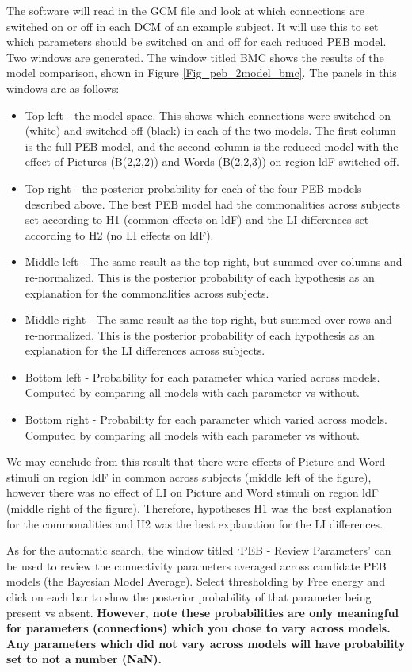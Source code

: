 \documentclass{article}
\begin{document}
The software will read in the GCM file and look at which connections are switched on or off in each DCM of an example subject. It will use this to set which parameters should be switched on and off for each reduced PEB model. Two windows are generated. The window titled BMC shows the results of the model comparison, shown in Figure \ref{Fig_peb_2model_bmc}. The panels in this windows are as follows:
\begin{itemize}
    \item Top left - the model space. This shows which connections were switched on (white) and switched off (black) in each of the two models. The first column is the full PEB model, and the second column is the reduced model with the effect of Pictures (B(2,2,2)) and Words (B(2,2,3)) on region ldF switched off.
    \item Top right - the posterior probability for each of the four PEB models described above. The best PEB model had the commonalities across subjects set according to H1 (common effects on ldF) and the LI differences set according to H2 (no LI effects on ldF).
    \item Middle left - The same result as the top right, but summed over columns and re-normalized. This is the posterior probability of each  hypothesis as an explanation for the commonalities across subjects.
    \item Middle right - The same result as the top right, but summed over rows and re-normalized. This is the posterior probability of each  hypothesis as an explanation for the LI differences across subjects.
    \item Bottom left - Probability for each parameter which varied across models. Computed by comparing all models with each parameter vs without.
    \item Bottom right - Probability for each parameter which varied across models. Computed by comparing all models with each parameter vs without.
\end{itemize}

We may conclude from this result that there were effects of Picture and Word stimuli on region ldF in common across subjects (middle left of the figure), however there was no effect of LI on Picture and Word stimuli on region ldF (middle right of the figure). Therefore, hypotheses H1 was the best explanation for the commonalities and H2 was the best explanation for the LI differences.

As for the automatic search, the window titled `PEB - Review Parameters' can be used to review the connectivity parameters averaged across candidate PEB models (the Bayesian Model Average). Select thresholding by Free energy and click on each bar to show the posterior probability of that parameter being present vs absent. \textbf{However, note these probabilities are only meaningful for parameters (connections) which you chose to vary across models. Any parameters which did not vary across models will have probability set to not a number (NaN).} 
\end{document}

